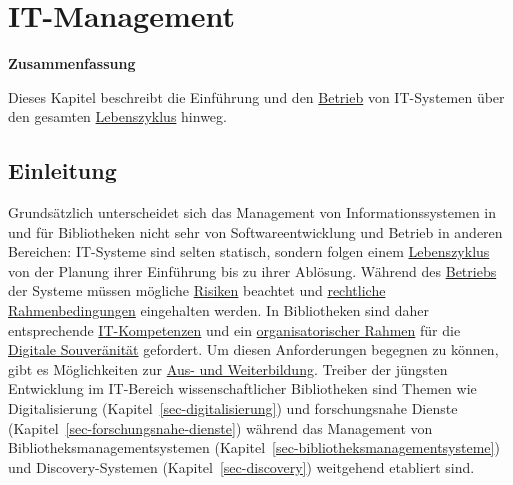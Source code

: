 \documentclass[
  11pt,
  letterpaper,
  DIV=11,
  twoside]{scrreprt}
\begin{document}
\chapter{IT-Management}\label{sec-management}

\begin{tcolorbox}[enhanced jigsaw, leftrule=.75mm, toprule=.15mm, left=2mm, opacityback=0, arc=.35mm, colback=white, breakable, colframe=quarto-callout-note-color-frame, rightrule=.15mm, bottomrule=.15mm]
\begin{minipage}[t]{5.5mm}
\textcolor{quarto-callout-note-color}{\faInfo}
\end{minipage}%
\begin{minipage}[t]{\textwidth - 5.5mm}

\vspace{-3mm}\textbf{Zusammenfassung}\vspace{3mm}

Dieses Kapitel beschreibt die Einführung und den
\hyperref[sec-betriebsmodelle]{Betrieb} von IT-Systemen über den
gesamten \hyperref[it-lebenszyklus]{Lebenszyklus} hinweg.

\end{minipage}%
\end{tcolorbox}

\section{Einleitung}\label{einleitung-2}

Grundsätzlich unterscheidet sich das Management von Informationssystemen
in und für Bibliotheken nicht sehr von Softwareentwicklung und Betrieb
in anderen Bereichen: IT-Systeme sind selten statisch, sondern folgen
einem \hyperref[it-lebenszyklus]{Lebenszyklus} von der Planung ihrer
Einführung bis zu ihrer Ablösung. Während des
\hyperref[sec-betriebsmodelle]{Betriebs} der Systeme müssen mögliche
\hyperref[betriebssicherheit-und-risikomanagement]{Risiken} beachtet und
\hyperref[rechtliche-rahmenbedingungen]{rechtliche Rahmenbedingungen}
eingehalten werden. In Bibliotheken sind daher entsprechende
\hyperref[kompetenzen]{IT-Kompetenzen} und ein
\hyperref[organisation]{organisatorischer Rahmen} für die
\hyperref[digitale-souveruxe4nituxe4t]{Digitale Souveränität} gefordert.
Um diesen Anforderungen begegnen zu können, gibt es Möglichkeiten zur
\hyperref[aus--und-weiterbildung]{Aus- und Weiterbildung}. Treiber der
jüngsten Entwicklung im IT-Bereich wissenschaftlicher Bibliotheken sind
Themen wie Digitalisierung (Kapitel~\ref{sec-digitalisierung}) und
forschungsnahe Dienste (Kapitel~\ref{sec-forschungsnahe-dienste})
während das Management von Bibliotheksmanagementsystemen
(Kapitel~\ref{sec-bibliotheksmanagementsysteme}) und Discovery-Systemen
(Kapitel~\ref{sec-discovery}) weitgehend etabliert sind.
\end{document}
